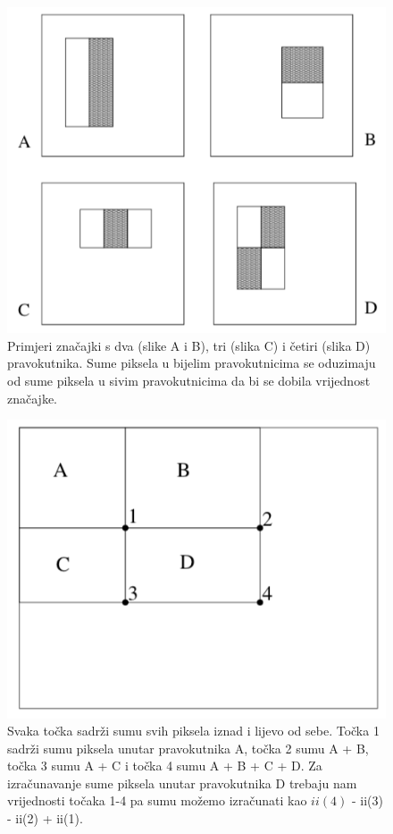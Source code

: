 \begin{figure}
	\centering
	\includegraphics[scale=1]{img/viola-jones-znacajke.png}
	\caption{Primjeri značajki s dva (slike A i B), tri (slika C) i četiri (slika D) pravokutnika. Sume piksela u bijelim pravokutnicima se oduzimaju od sume piksela u sivim pravokutnicima da bi se dobila vrijednost značajke.}
	\label{viola-jones-znacajke}
\end{figure}

\begin{figure}
	\centering
	\includegraphics[scale=1]{img/viola-jones-pravokutnici.png}
	\caption{Svaka točka sadrži sumu svih piksela iznad i lijevo od sebe. Točka 1 sadrži sumu piksela unutar pravokutnika A, točka 2 sumu A + B, točka 3 sumu A + C i točka 4 sumu A + B + C + D. Za izračunavanje sume piksela unutar pravokutnika D trebaju nam vrijednosti točaka 1-4 pa sumu možemo izračunati kao $ii(4)$ - ii(3) - ii(2) + ii(1).}
	\label{viola-jones-pravokutnici}
\end{figure}

